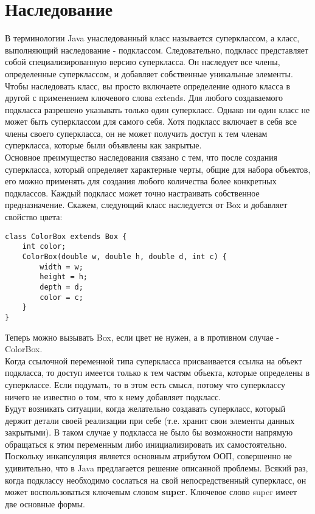 \section{Наследование}
В терминологии Java унаследованный класс называется суперклассом, а класс, выполняющий наследование - подклассом. Следовательно, подкласс представляет собой специализированную версию суперкласса. Он наследует все члены, определенные суперклассом, и добавляет собственные уникальные элементы. Чтобы наследовать класс, вы просто включаете определение одного класса в другой с применением ключевого слова extends. Для любого создаваемого подкласса разрешено указывать только один суперкласс. Однако ни один класс не может быть суперклассом для самого себя. Хотя подкласс включает в себя все члены своего суперкласса, он не может получить доступ к тем членам суперкласса, которые были объявлены как закрытые. \\
Основное преимущество наследования связано с тем, что после создания суперкласса, который определяет характерные черты, общие для набора объектов, его можно применять для создания любого количества более конкретных подклассов. Каждый подкласс может точно настраивать собственное предназначение. Скажем, следующий класс наследуется от Box и добавляет свойство цвета:
\begin{lstlisting}
class ColorBox extends Box {
    int color;
    ColorBox(double w, double h, double d, int c) {
        width = w;
        height = h;
        depth = d;
        color = c;
    }
}
\end{lstlisting}
Теперь можно вызывать Box, если цвет не нужен, а в противном случае - ColorBox. \\
Когда ссылочной переменной типа суперкласса присваивается ссылка на объект подкласса, то доступ имеется только к тем частям объекта, которые определены в суперклассе. Если подумать, то в этом есть смысл, потому что суперклассу ничего не известно о том, что к нему добавляет подкласс. \\
Будут возникать ситуации, когда желательно создавать суперкласс, который держит детали своей реализации при себе (т.е. хранит свои элементы данных закрытыми). В таком случае у подкласса не было бы возможности напрямую обращаться к этим переменным либо инициализировать их самостоятельно. Поскольку инкапсуляция является основным атрибутом ООП, совершенно не удивительно, что в Java предлагается решение описанной проблемы. Всякий раз, когда подклассу необходимо сослаться на свой непосредственный суперкласс, он может воспользоваться ключевым словом \textbf{super}. Ключевое слово super имеет две основные формы. \\
